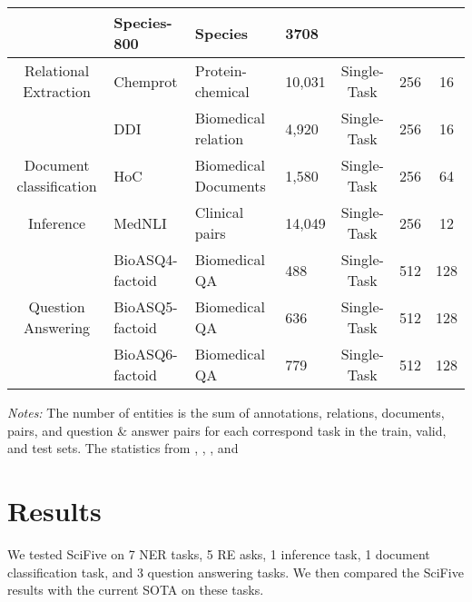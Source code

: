 \documentclass[nocrop]{bioinfo}
\begin{document}
\begin{table*}[]
\begin{tabular}{@{}clllccc@{}}
                                         & Species-800     & Species              & 3708                 &                                       &                      &                      \\ \midrule
Relational Extraction                    & Chemprot        & Protein-chemical     & 10,031               & Single-Task                           & 256                  & 16                   \\
                                         & DDI             & Biomedical relation  & 4,920                & Single-Task                           & 256                  & 16                   \\ \midrule
Document classification                  & HoC             & Biomedical Documents & 1,580                & Single-Task                           & 256                  & 64                   \\ \midrule
Inference                                & MedNLI          & Clinical pairs       & 14,049               & Single-Task                           & 256                  & 12                   \\ \midrule
\multirow{3}{*}{Question Answering}      & BioASQ4-factoid & Biomedical QA        & 488                  & Single-Task                           & 512                  & 128                  \\
                                         & BioASQ5-factoid & Biomedical QA        & 636                  & Single-Task                           & 512                  & 128                  \\
                                         & BioASQ6-factoid & Biomedical QA        & 779                  & Single-Task                           & 512                  & 128                  \\ \bottomrule
\end{tabular}
\label{setting}
\begin{tablenotes}
      \small
      \item \textit{Notes:} The number of entities is the sum of annotations, relations, documents, pairs, and question \& answer pairs for each correspond task in the train, valid, and test sets. The statistics from \cite{DBLP:journals/corr/abs-1901-08746}, \cite{DBLP:journals/corr/abs-1906-05474}, \cite{article}, and \cite{DBLP:journals/corr/abs-1810-10566}
\end{tablenotes}
\end{table*} \section{Results}
We tested SciFive on 7 NER tasks, 5 RE asks, 1 inference task, 1 document classification task, and 3 question answering tasks. We then compared the SciFive results with the current SOTA on these tasks.
\end{document}
